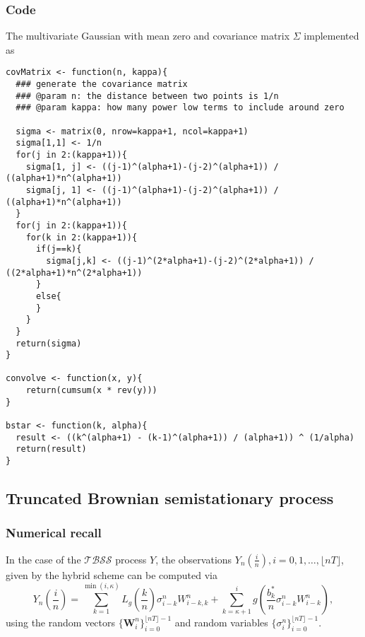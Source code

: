 \documentclass[12pt]{article}
\numberwithin{equation}{section}
\begin{document}
      \subsubsection{Code}
        The multivariate Gaussian with mean zero and covariance matrix $\Sigma$ implemented as 
        \begin{lstlisting}
covMatrix <- function(n, kappa){
  ### generate the covariance matrix
  ### @param n: the distance between two points is 1/n
  ### @param kappa: how many power low terms to include around zero
      
  sigma <- matrix(0, nrow=kappa+1, ncol=kappa+1)
  sigma[1,1] <- 1/n
  for(j in 2:(kappa+1)){
    sigma[1, j] <- ((j-1)^(alpha+1)-(j-2)^(alpha+1)) / ((alpha+1)*n^(alpha+1))
    sigma[j, 1] <- ((j-1)^(alpha+1)-(j-2)^(alpha+1)) / ((alpha+1)*n^(alpha+1))
  }
  for(j in 2:(kappa+1)){
    for(k in 2:(kappa+1)){
      if(j==k){
        sigma[j,k] <- ((j-1)^(2*alpha+1)-(j-2)^(2*alpha+1)) / ((2*alpha+1)*n^(2*alpha+1))
      }
      else{                            
      }
    }
  }
  return(sigma)
}

convolve <- function(x, y){
    return(cumsum(x * rev(y)))
}

bstar <- function(k, alpha){
  result <- ((k^(alpha+1) - (k-1)^(alpha+1)) / (alpha+1)) ^ (1/alpha)
  return(result)
}
        \end{lstlisting}

    \subsection{Truncated Brownian semistationary process}
      \subsubsection{Numerical recall}
    
      In the case of the $\mathcal{TBSS}$ process $Y$, the observations $Y_n(\frac{i}{n}), i=0,1,\dots,\lfloor nT \rfloor$, given by the hybrid scheme can be computed via
      \begin{equation}
        Y_n(\frac{i}{n}) = \sum_{k=1}^{\min(i,\kappa)}L_g(\frac{k}{n})\sigma_{i-k}^nW_{i-k,k}^n + \sum_{k=\kappa+1}^{i} g(\frac{b_k^*}{n}\sigma_{i-k}^nW_{i-k}^n),
      \end{equation}
      using the random vectors $\{\bm{W}_i^n\}_{i=0}^{\lfloor nT \rfloor-1}$ and random variables $\{\sigma_i^n\}_{i=0}^{\lfloor nT\rfloor-1}$.
\end{document}
